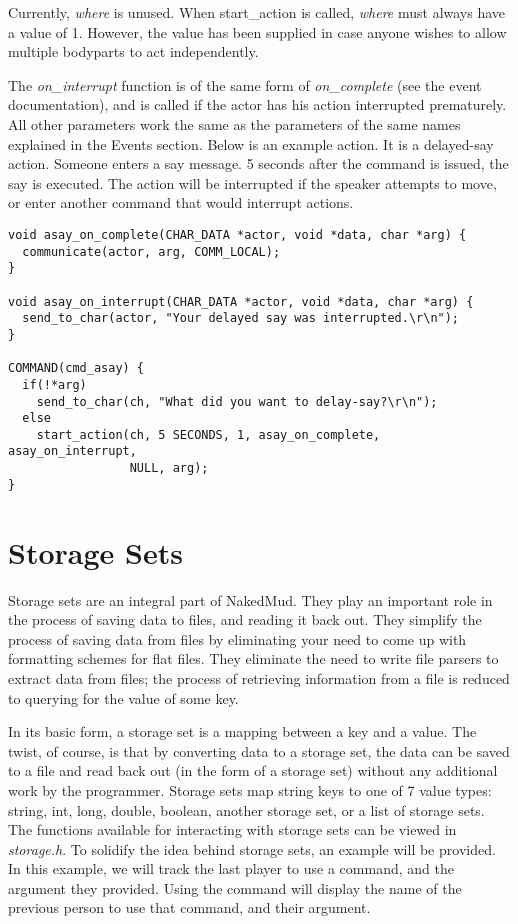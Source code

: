 \documentclass[fignum,doc]{article}
\begin{document}
\begin{doublespace}
Currently, {\it where} is unused. When start\_action is called, {\it where} must always have a value of 1. However, the value has been supplied in case anyone wishes to allow multiple bodyparts to act independently. 

The {\it on\_interrupt} function is of the same form of {\it on\_complete} (see the event documentation), and is called if the actor has his action interrupted prematurely. All other parameters work the same as the parameters of the same names explained in the Events section. Below is an example action. It is a delayed-say action. Someone enters a say message. 5 seconds after the command is issued, the say is executed. The action will be interrupted if the speaker attempts to move, or enter another command that would interrupt actions.

\begin{singlespace}\begin{verbatim}
void asay_on_complete(CHAR_DATA *actor, void *data, char *arg) {
  communicate(actor, arg, COMM_LOCAL);
}
  
void asay_on_interrupt(CHAR_DATA *actor, void *data, char *arg) {
  send_to_char(actor, "Your delayed say was interrupted.\r\n");
}

COMMAND(cmd_asay) {
  if(!*arg)
    send_to_char(ch, "What did you want to delay-say?\r\n");
  else
    start_action(ch, 5 SECONDS, 1, asay_on_complete, asay_on_interrupt, 
                 NULL, arg);
}
\end{verbatim}\end{singlespace}



\section{Storage Sets}
Storage sets are an integral part of NakedMud. They play an important role in the process of saving data to files, and reading it back out. They simplify the process of saving data from files by eliminating your need to come up with formatting schemes for flat files. They eliminate the need to write file parsers to extract data from files; the process of retrieving information from a file is reduced to querying for the value of some key.

In its basic form, a storage set is a mapping between a key and a value. The twist, of course, is that by converting data to a storage set, the data can be saved to a file and read back out (in the form of a storage set) without any additional work by the programmer. Storage sets map string keys to one of 7 value types: string, int, long, double, boolean, another storage set, or a list of storage sets. The functions available for interacting with storage sets can be viewed in {\it storage.h}. To solidify the idea behind storage sets, an example will be provided. In this example, we will track the last player to use a command, and the argument they provided. Using the command will display the name of the previous person to use that command, and their argument.


\end{doublespace}
\end{document}
